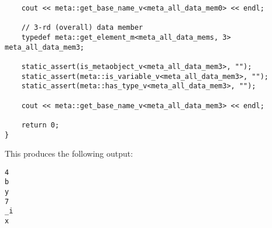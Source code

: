 \begin{verbatim}
	cout << meta::get_base_name_v<meta_all_data_mem0> << endl;

	// 3-rd (overall) data member
	typedef meta::get_element_m<meta_all_data_mems, 3> meta_all_data_mem3;

	static_assert(is_metaobject_v<meta_all_data_mem3>, "");
	static_assert(meta::is_variable_v<meta_all_data_mem3>, "");
	static_assert(meta::has_type_v<meta_all_data_mem3>, "");

	cout << meta::get_base_name_v<meta_all_data_mem3> << endl;

	return 0;
}

\end{verbatim}

This produces the following output:

\begin{verbatim}
4
b
y
7
_i
x
\end{verbatim}
